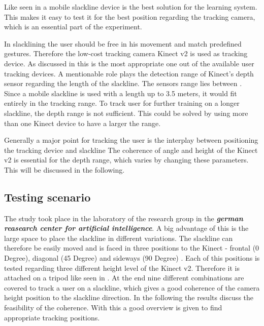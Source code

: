 Like seen in \textit{} a mobile slackline device is the best solution for the learning system. This makes it easy to test it for the best position regarding the tracking camera, which is an essential part of the experiment.

In slacklining the user should be free in his movement and match predefined gestures. Therefore the low-cost tracking camera Kinect v2 is used as tracking device. As discussed in \textbf{} this is the most appropriate one out of the available user tracking devices.
A mentionable role plays the detection range of Kinect’s depth sensor regarding the length of the slackline. The sensors range lies between \textbf{}. Since a mobile slackline is used with a length up to 3.5 meters, it would fit entirely in the tracking range. To track user for further training on a longer slackline, the depth range is not sufficient. This could be solved by using more than one Kinect device to have a larger the range. 

Generally a major point for tracking the user is the interplay between positioning the tracking device and slackline The coherence of angle and height of the Kinect v2 is essential for the depth range, which varies by changing these parameters. This will be discussed in the following.

\subsection{Testing scenario}

The study took place in the laboratory of the research group in the \textit{\textbf{german reasearch center for artificial intelligence}}. A big advantage of this is the large space to place the slackline in different variations. The slackline can therefore be easily moved and is faced in three positions to the Kinect - frontal (0 Degree), diagonal (45 Degree) and sideways (90 Degree) \textbf{}. Each of this positions is tested regarding three different height level of the Kinect v2. Therefore it is attached on a tripod like seen in \textbf{}. At the end nine different combinations are covered to track a user on a slackline, which gives a good coherence of the camera height position to the slackline direction. In the following the results discuss the feasibility of the coherence. With this a good overview is given to find appropriate tracking positions.

